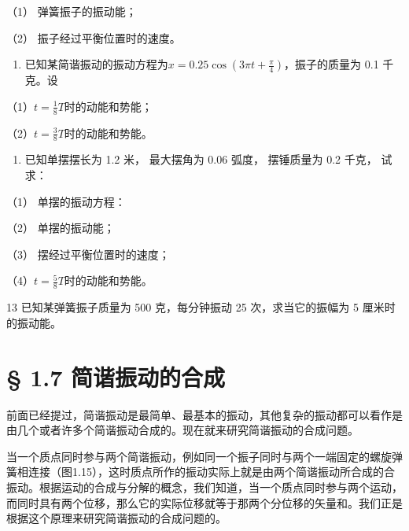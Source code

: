 （1） 弹簧振子的振动能；

（2） 振子经过平衡位置时的速度。

\begin{enumerate}
\def\labelenumi{\arabic{enumi}.}
\setcounter{enumi}{10}
\tightlist
\item
  已知某简谐振动的振动方程为\(x = 0.25 \cos \left(3\pi t + \frac{\pi}{4}\right)\)，振子的质量为
  0.1 千克。设
\end{enumerate}

（1）\(t = \frac{1}{8} T\)时的动能和势能；

（2）\(t = \frac{3}{8} T\)时的动能和势能。

\begin{enumerate}
\def\labelenumi{\arabic{enumi}.}
\setcounter{enumi}{11}
\tightlist
\item
  已知单摆摆长为 1.2 米， 最大摆角为 0.06 弧度， 摆锤质量为 0.2 千克，
  试求：
\end{enumerate}

（1） 单摆的振动方程：

（2） 单摆的振动能；

（3） 摆经过平衡位置时的速度；

（4）\(t = \frac{5}{8} T\)时的动能和势能。

13 已知某弹簧振子质量为 500 克，每分钟振动 25 次，求当它的振幅为 5
厘米时的振动能。

\section{§ 1.7
简谐振动的合成}\label{ux7b80ux8c10ux632fux52a8ux7684ux5408ux6210}

前面已经提过，简谐振动是最简单、最基本的振动，其他复杂的振动都可以看作是由几个或者许多个简谐振动合成的。现在就来研究简谐振动的合成问题。

当一个质点同时参与两个简谐振动，例如同一个振子同时与两个一端固定的螺旋弹簧相连接（图1.15），这时质点所作的振动实际上就是由两个简谐振动所合成的合振动。根据运动的合成与分解的概念，我们知道，当一个质点同时参与两个运动，而同时具有两个位移，那么它的实际位移就等于那两个分位移的矢量和。我们正是根据这个原理来研究简谐振动的合成问题的。

